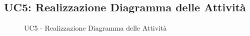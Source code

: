 \subsection{UC5: Realizzazione Diagramma delle Attività}
\label{UC5}
\begin{figure}[H]
	\caption{UC5 - Realizzazione Diagramma delle Attività}
\end{figure}
